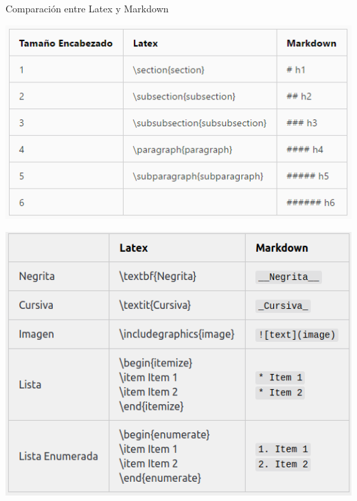 \documentclass[11pt]{beamer}
\begin{document}
\begin{frame}{Comparación entre Latex y Markdown}
\begin{center}
\includegraphics[scale=0.8]{imagenes/com.png} 
\end{center}
\end{frame}

\begin{frame}
\begin{center}
\includegraphics[scale=0.6]{imagenes/table.png} 
\end{center}
\end{frame}
\end{document}
